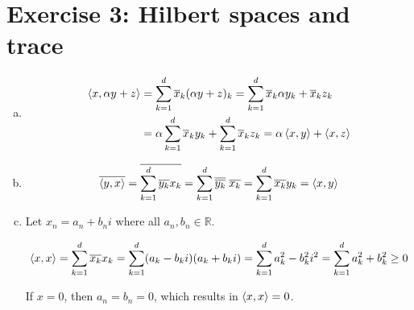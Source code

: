\documentclass[a4paper,german,12pt,smallheadings]{scrartcl}
\begin{document}
\section*{Exercise 3: Hilbert spaces and trace}
\begin{enumerate}[a)]
  \item
    \begin{align*}
      \braket{x, \alpha y + z} &=
      \sum_{k=1}^d \overline{x}_k (\alpha y + z)_k =
      \sum_{k=1}^d \overline{x}_k \alpha y_k + \overline{x}_k z_k \\
      &= \alpha \sum_{k=1}^d \overline{x}_k y_k + \sum_{k=1}^d \overline{x}_k z_k =
      \alpha \braket{x,y} + \braket{x,z}
    \end{align*}
  \item
    \begin{equation*}
      \overline{\braket{y,x}} =
      \overline{\sum_{k=1}^d \overline{y_k} x_k} =
      \sum_{k=1}^d \overline{\overline{y_k}}\; \overline{x_k} =
      \sum_{k=1}^d \overline{x_k} y_k =
      \braket{x,y}
    \end{equation*}
  \item
    Let $x_n = a_n+b_ni$ where all $a_n,b_n \in \mathbb{R}$.

    \begin{equation*}
      \braket{x,x} =
      \sum_{k=1}^d \overline{x_k} x_k =
      \sum_{k=1}^d (a_k-b_ki)(a_k+b_ki) =
      \sum_{k=1}^d a_k^2 - b_k^2i^2 =
      \sum_{k=1}^d a_k^2 + b_k^2 \ge 0
    \end{equation*}

    If $x = 0$, then $a_n = b_n = 0$, which results in $\braket{x, x} = 0$.
\end{enumerate}
\end{document}
